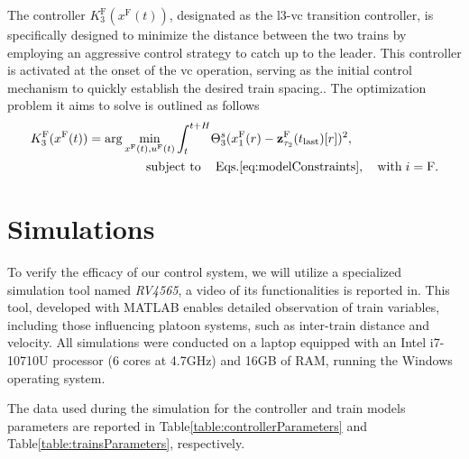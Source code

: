 The controller $K^{\mathrm{F}}_3(x^{\mathrm{F}}(t))$, designated as the \gls{l3}-\gls{vc} transition controller, is specifically designed to minimize the distance between the two trains by employing an aggressive control strategy to catch up to the leader. This controller is activated at the onset of the \gls{vc} operation, serving as the initial control mechanism to quickly establish the desired train spacing.. The optimization problem it aims to solve is outlined as follows
%
\begin{equation}
	\label{eq:K_3_controller}
	\begin{aligned}
		K^{\mathrm{F}}_3(x^\mathrm{F}(t)) = \arg  \min_{x^{\mathrm{F}}(t), u^{\mathrm{F}}(t)} \int_{t}^{t+H}& \Theta^s_3(x_1^{\mathrm{F}}(r)-\mathbf{z}_{\tau_2}^\mathrm{F}(t_{\mathrm{last}})[r])^2, \\
		&	\hspace{-1.8cm} \text{subject to} \qquad \hspace{-1cm}  \qquad \mathrm{Eqs.}\eqref{eq:modelConstraints}, \quad \mathrm{with} \; i = \mathrm{F}.
	\end{aligned}
\end{equation}

		
		
		
		
		
		
		
		\section{Simulations}
		\label{sec:Simulations}
		
		To verify the efficacy of our control system, we will utilize a specialized simulation tool named \textit{RV4565}, a video of its functionalities is reported in\tildeAdd\cite{youtubeVideoVC}. This tool, developed with MATLAB enables detailed observation of train variables, including those influencing platoon systems, such as inter-train distance and velocity. All simulations were conducted on a laptop equipped with an Intel i7-10710U processor (6 cores at 4.7GHz) and 16GB of RAM, running the Windows operating system.
		
		
		The data used during the simulation for the controller and train models parameters are reported in Table\tildeAdd\ref{table:controllerParameters} and Table\tildeAdd\ref{table:trainsParameters}, respectively.
		
